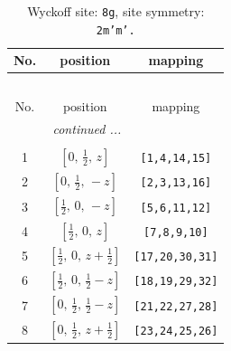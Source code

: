 \documentclass[fleqn,8pt]{jsarticle}
\begin{document}
\begin{longtable}{ccc}
\caption{Wyckoff site: {\tt 8g}, site symmetry: {\tt 2m'm'.}}
 \\
 \hline \hline
No. & position & mapping \\ \hline \endfirsthead

\multicolumn{2}{l}{\tablename\ \thetable{}} \\
 \hline \hline
No. & position & mapping \\ \hline \endhead

 \hline \hline
\multicolumn{2}{r}{\footnotesize\it continued ...} \\ \endfoot

 \hline \hline
\multicolumn{2}{r}{} \\ \endlastfoot

1 & $\left[ 0,\, \frac{1}{2},\, z \right]$ & {\tt [1,4,14,15]} \\ \hline
2 & $\left[ 0,\, \frac{1}{2},\, - z \right]$ & {\tt [2,3,13,16]} \\ \hline
3 & $\left[ \frac{1}{2},\, 0,\, - z \right]$ & {\tt [5,6,11,12]} \\ \hline
4 & $\left[ \frac{1}{2},\, 0,\, z \right]$ & {\tt [7,8,9,10]} \\ \hline
5 & $\left[ \frac{1}{2},\, 0,\, z + \frac{1}{2} \right]$ & {\tt [17,20,30,31]} \\ \hline
6 & $\left[ \frac{1}{2},\, 0,\, \frac{1}{2} - z \right]$ & {\tt [18,19,29,32]} \\ \hline
7 & $\left[ 0,\, \frac{1}{2},\, \frac{1}{2} - z \right]$ & {\tt [21,22,27,28]} \\ \hline
8 & $\left[ 0,\, \frac{1}{2},\, z + \frac{1}{2} \right]$ & {\tt [23,24,25,26]} \\
\end{longtable}
\renewcommand{\arraystretch}{1.2}
\end{document}
